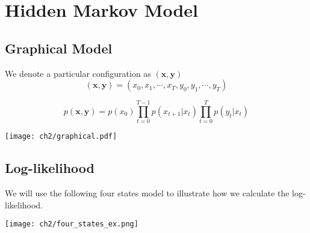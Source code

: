 \chapter{Hidden Markov Model}
\section{Graphical Model}
\begin{definition}
We denote a particular configuration as $(\textbf{x}, \textbf{y})$
\begin{equation}
(\textbf{x}, \textbf{y})=(x_0, x_1, \cdots, x_T, y_0, y_1, \cdots, y_T)
\end{equation}
\end{definition}

\begin{definition}
\begin{equation}
p(\textbf{x}, \textbf{y})= p(x_0)\prod_{t=0}^{T-1} p(x_{t+1}|x_t) \prod_{t=0}^{T}p(y_t|x_t)
\end{equation}
\end{definition}
\begin{center}
        \texttt{[image: ch2/graphical.pdf]}   
\end{center}

\section{Log-likelihood}
We will use the following four states model to illustrate how we calculate the log-likelihood.
\begin{center}
        \texttt{[image: ch2/four\_states\_ex.png]}   
\end{center}

